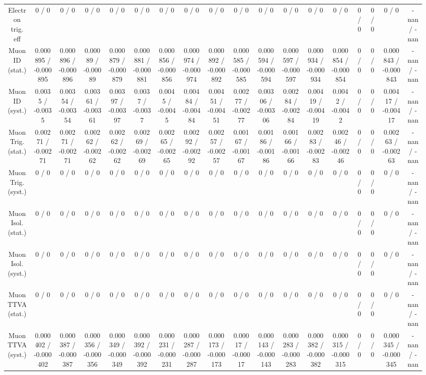 \documentclass[10pt]{article}
\begin{document}
\begin{table}[htbp]
\begin{center}
\begin{tabular}{|c|c|c|c|c|c|c|c|c|c|c|c|c|c|c|c|c|c|}
  Electron trig. eff & 0 / 0 & 0 / 0 & 0 / 0 & 0 / 0 & 0 / 0 & 0 / 0 & 0 / 0 & 0 / 0 & 0 / 0 & 0 / 0 & 0 / 0 & 0 / 0 & 0 / 0 & 0 / 0 & 0 / 0 & 0 / 0 & -nan / -nan \\ 
  Muon ID (stat.) & 0.000895 / -0.000895 & 0.000896 / -0.000896 & 0.00089 / -0.00089 & 0.000879 / -0.000879 & 0.000881 / -0.000881 & 0.000856 / -0.000856 & 0.000974 / -0.000974 & 0.000892 / -0.000892 & 0.000585 / -0.000585 & 0.000594 / -0.000594 & 0.000597 / -0.000597 & 0.000934 / -0.000934 & 0.000854 / -0.000854 & 0 / 0 & 0 / 0 & 0.000843 / -0.000843 & -nan / -nan \\ 
  Muon ID (syst.) & 0.0035 / -0.0035 & 0.00354 / -0.00354 & 0.00361 / -0.00361 & 0.00397 / -0.00397 & 0.0037 / -0.0037 & 0.0045 / -0.0045 & 0.00484 / -0.00484 & 0.00451 / -0.00451 & 0.00277 / -0.00277 & 0.00306 / -0.00306 & 0.00284 / -0.00284 & 0.00419 / -0.00419 & 0.0042 / -0.0042 & 0 / 0 & 0 / 0 & 0.00417 / -0.00417 & -nan / -nan \\ 
  Muon Trig. (stat.) & 0.00271 / -0.00271 & 0.00271 / -0.00271 & 0.00262 / -0.00262 & 0.00262 / -0.00262 & 0.00269 / -0.00269 & 0.00265 / -0.00265 & 0.00292 / -0.00292 & 0.00257 / -0.00257 & 0.00167 / -0.00167 & 0.00186 / -0.00186 & 0.00166 / -0.00166 & 0.00283 / -0.00283 & 0.00246 / -0.00246 & 0 / 0 & 0 / 0 & 0.00263 / -0.00263 & -nan / -nan \\ 
  Muon Trig. (syst.) & 0 / 0 & 0 / 0 & 0 / 0 & 0 / 0 & 0 / 0 & 0 / 0 & 0 / 0 & 0 / 0 & 0 / 0 & 0 / 0 & 0 / 0 & 0 / 0 & 0 / 0 & 0 / 0 & 0 / 0 & 0 / 0 & -nan / -nan \\ 
  Muon Isol. (stat.) & 0 / 0 & 0 / 0 & 0 / 0 & 0 / 0 & 0 / 0 & 0 / 0 & 0 / 0 & 0 / 0 & 0 / 0 & 0 / 0 & 0 / 0 & 0 / 0 & 0 / 0 & 0 / 0 & 0 / 0 & 0 / 0 & -nan / -nan \\ 
  Muon Isol. (syst.) & 0 / 0 & 0 / 0 & 0 / 0 & 0 / 0 & 0 / 0 & 0 / 0 & 0 / 0 & 0 / 0 & 0 / 0 & 0 / 0 & 0 / 0 & 0 / 0 & 0 / 0 & 0 / 0 & 0 / 0 & 0 / 0 & -nan / -nan \\ 
  Muon TTVA (stat.) & 0 / 0 & 0 / 0 & 0 / 0 & 0 / 0 & 0 / 0 & 0 / 0 & 0 / 0 & 0 / 0 & 0 / 0 & 0 / 0 & 0 / 0 & 0 / 0 & 0 / 0 & 0 / 0 & 0 / 0 & 0 / 0 & -nan / -nan \\ 
  Muon TTVA (syst.) & 0.000402 / -0.000402 & 0.000387 / -0.000387 & 0.000356 / -0.000356 & 0.000349 / -0.000349 & 0.000392 / -0.000392 & 0.000231 / -0.000231 & 0.000287 / -0.000287 & 0.000173 / -0.000173 & 0.00017 / -0.00017 & 0.000143 / -0.000143 & 0.000283 / -0.000283 & 0.000382 / -0.000382 & 0.000315 / -0.000315 & 0 / 0 & 0 / 0 & 0.000345 / -0.000345 & -nan / -nan \\ 

\end{tabular}
\end{center}
\end{table}
\end{document}
